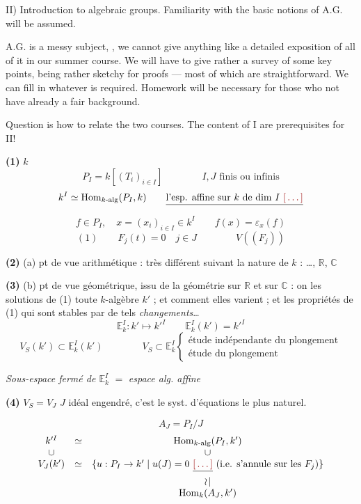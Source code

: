 \documentclass[11pt,a4paper]{article}
\begin{document}
II) Introduction to algebraic groups. Familiarity with the basic notions of A.G. will be assumed.

A.G. is a messy subject, , we cannot give anything like a detailed exposition of all of it in our summer course. We will have to give rather a survey of some key points, being rather sketchy for proofs --- most of which are straightforward. We can fill in whatever is required. Homework will be necessary for those who  not have already a fair background.

Question is how to relate the two courses. The content of I are prerequisites for II!

\textbf{(1)} $k$
\[
P_I = k[(T_i)_{i \in I}] \qquad\qquad I, J \text{ finis ou infinis}
\]
\[
k^I \simeq \operatorname{Hom}_{k\text{-alg}}(P_I, k) \qquad \struck{\text{l'esp. affine sur } k \text{ de dim } I \ \ill{}}
\]
\[
f \in P_I, \quad x = (x_i)_{i \in I} \in k^I \qquad f(x) = \varepsilon_x(f)
\]
\[
(1) \qquad F_j(t) = 0 \quad j \in J \qquad\qquad V((F_j))
\]

\textbf{(2)} (a) pt de vue arithmétique : très différent suivant la nature de $k$ : …, $\mathbb{R}$, $\mathbb{C}$

\textbf{(3)} (b) pt de vue géométrique, issu de la géométrie sur $\mathbb{R}$ et sur $\mathbb{C}$ : on  les solutions de (1)  toute  $k$-algèbre $k'$ ; et comment elles varient ; et les propriétés de (1) qui sont stables par de tels \emph{changements}…
\[
\mathbb{E}^I_k : k' \longmapsto k'^I \qquad \mathbb{E}^I_k(k') = k'^I
\]
\[
V_S(k') \subset \mathbb{E}^I_k(k') \qquad\qquad V_S \subset \mathbb{E}^I_k
\begin{cases}
\text{étude indépendante du plongement} \\
\text{étude du plongement}
\end{cases}
\]

\emph{Sous-espace  fermé de $\mathbb{E}^I_k$} $=$ \emph{espace alg. affine}

\textbf{(4)} $V_S = V_J$ \quad $J$ idéal engendré, c'est le syst. d'équations le plus naturel.

\[
A_J = P_I / J
\]
\[
\begin{array}{ccc}
k'^I & \simeq & \operatorname{Hom}_{k\text{-alg}}(P_I, k') \\
\cup & & \cup \\
V_J(k') & \simeq & \{ u : P_I \to k' \mid u(J) = 0 \ \struck{\ill{}} \ (\text{i.e. s'annule sur les } F_j) \} \\
& & \wr\! \mid \\
& & \operatorname{Hom}_k(A_J, k')
\end{array}
\]
\end{document}

